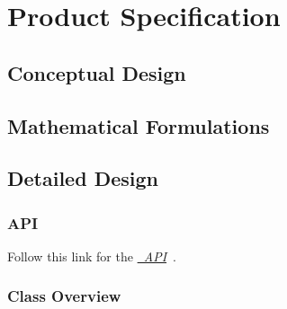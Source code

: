 \chapter{Product Specification}\label{ch:spec}

\section{Conceptual Design}



\section{Mathematical Formulations}


\section{Detailed Design}\label{sec:detailed_design}
\subsection{API}
Follow this link for the
\href{file:refman.pdf}{\em \ModelDesc\ API}~\cite{api:mass}.

\subsection{Class Overview}


